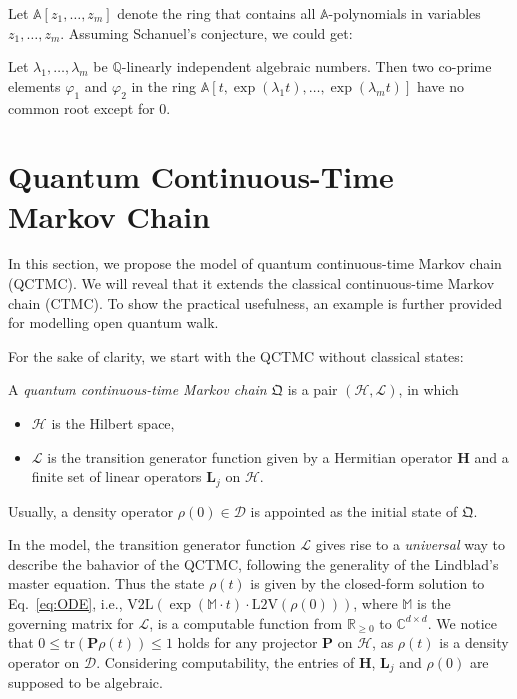 \documentclass[a4paper,UKenglish,cleveref,autoref,thm-restate,authorcolumns]{lipics-v2019}
\newcommand{\QC}{\mathfrak{Q}}
\newcommand{\h}{\mathcal{H}}
\renewcommand{\L}{\mathcal{L}}
\newcommand{\D}{\mathcal{D}}
\newcommand{\M}{\mathds{M}}
\newcommand{\HH}{\mathbf{H}}
\newcommand{\LL}{\mathbf{L}}
\newcommand{\PP}{\mathbf{P}}
\newcommand{\vl}{\mathrm{V2L}}
\newcommand{\lv}{\mathrm{L2V}}
\newcommand{\tr}{\mathrm{tr}}
\begin{document}
Let $\mathbb{A}[z_1,\ldots,z_m]$ denote the ring
that contains all $\mathbb{A}$-polynomials in variables $z_1,\ldots,z_m$.
Assuming Schanuel's conjecture, we could get:
\begin{corollary}\label{cor:common}
	Let $\lambda_1,\ldots,\lambda_m$ be
	$\mathbb{Q}$-linearly independent algebraic numbers.
	Then two co-prime elements $\varphi_1$ and $\varphi_2$
	in the ring $\mathbb{A}[t,\exp(\lambda_1 t),\ldots,\exp(\lambda_m t)]$
	have no common root except for $0$.
\end{corollary}
	
	
\section{Quantum Continuous-Time Markov Chain}\label{S3}
In this section, we propose the model of quantum continuous-time Markov chain (QCTMC).
We will reveal that it extends the classical continuous-time Markov chain (CTMC).
To show the practical usefulness,
an example is further provided for modelling open quantum walk.

For the sake of clarity,
we start with the QCTMC without classical states:

\begin{definition}\label{def:QCTMC1}
	A \emph{quantum continuous-time Markov chain} $\QC$ is a pair $(\h,\L)$,
	in which
	\begin{itemize}
		\item $\h$ is the Hilbert space,
		\item $\L$ is the transition generator function given by
		a Hermitian operator $\HH$
		and a finite set of linear operators $\LL_j$ on $\h$.
	\end{itemize}
	Usually, a density operator $\rho(0) \in \D$
	is appointed as the initial state of $\QC$.
\end{definition}

In the model,
the transition generator function $\L$ gives rise to a \emph{universal} way
to describe the bahavior of the QCTMC,
following the generality of the Lindblad's master equation.
Thus the state $\rho(t)$ is given by the closed-form solution to Eq.~\eqref{eq:ODE},
i.e., $\vl(\exp(\M\cdot t)\cdot\lv(\rho(0)))$, 
where $\M$ is the governing matrix for $\L$,
is a computable function from $\mathbb{R}_{\ge 0}$ to $\mathbb{C}^{d \times d}$.
We notice that $0 \le \tr(\PP \rho(t)) \le 1$ holds for any projector $\PP$ on $\h$,
as $\rho(t)$ is a density operator on $\D$.
Considering computability, the entries of $\HH$, $\LL_j$ and $\rho(0)$ are supposed to be algebraic.
\end{document}
